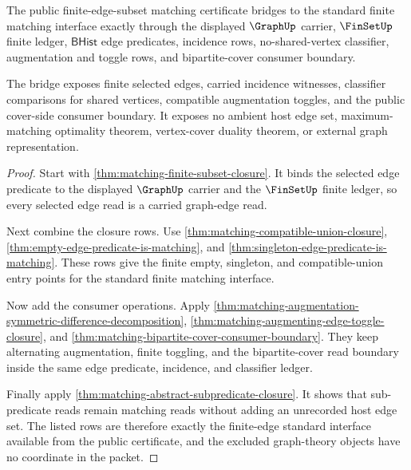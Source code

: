 \begin{theorem}
\label{thm:matching-standard-finite-edge-bridge}
The public finite-edge-subset matching certificate bridges to the standard
finite matching interface exactly through the displayed $\GraphUp$ carrier,
$\FinSetUp$ finite ledger, $\mathsf{BHist}$ edge predicates, incidence rows,
no-shared-vertex classifier, augmentation and toggle rows, and bipartite-cover
consumer boundary.

The bridge exposes finite selected edges, carried incidence witnesses,
classifier comparisons for shared vertices, compatible augmentation toggles,
and the public cover-side consumer boundary. It exposes no ambient host edge
set, maximum-matching optimality theorem, vertex-cover duality theorem, or
external graph representation.
\end{theorem}
\begin{proof}
Start with \autoref{thm:matching-finite-subset-closure}. It binds the selected
edge predicate to the displayed $\GraphUp$ carrier and the $\FinSetUp$ finite
ledger, so every selected edge read is a carried graph-edge read.

Next combine the closure rows. Use
\autoref{thm:matching-compatible-union-closure},
\autoref{thm:empty-edge-predicate-is-matching}, and
\autoref{thm:singleton-edge-predicate-is-matching}. These rows give the finite
empty, singleton, and compatible-union entry points for the standard finite
matching interface.

Now add the consumer operations. Apply
\autoref{thm:matching-augmentation-symmetric-difference-decomposition},
\autoref{thm:matching-augmenting-edge-toggle-closure}, and
\autoref{thm:matching-bipartite-cover-consumer-boundary}. They keep alternating
augmentation, finite toggling, and the bipartite-cover read boundary inside the
same edge predicate, incidence, and classifier ledger.

Finally apply \autoref{thm:matching-abstract-subpredicate-closure}. It shows
that sub-predicate reads remain matching reads without adding an unrecorded host
edge set. The listed rows are therefore exactly the finite-edge standard
interface available from the public certificate, and the excluded graph-theory
objects have no coordinate in the packet.
\end{proof}

